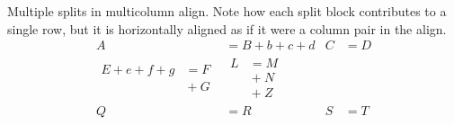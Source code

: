 \documentclass[a4paper]{book}
\begin{document}
Multiple splits in multicolumn align.
Note how each split block contributes to a single row, but it is
horizontally aligned as if it were a column pair in the align.
\begin{align}
  A &= B+b+c+d &
  C &= D \\
\begin{split}
  E+e+f+g &= F \\
    &{} + G
\end{split} &
\begin{split}
    L &= M\\
    &{}+N \\
    &{}+Z
  \end{split} \\
  Q &= R &
  S &= T
\end{align}
\end{document}
